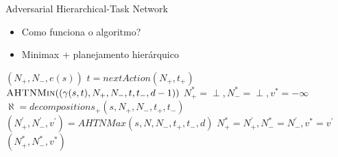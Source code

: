 \documentclass{beamer}
\begin{document}
\begin{frame}{Adversarial Hierarchical-Task Network}
	\begin{itemize}
		\item Como funciona o algoritmo?
		\item Minimax + planejamento hierárquico
	\end{itemize}
	
	{\tiny				
		\begin{algorithmic}[1]
				\label{alg:lin:firstLine}
				\State	\Return $(N_{+}, N_{-}, e(s))$
				\EndIf
				 \label{alg:ahtn:nexaction}
				\State $t = nextAction(N_{+}, t_{+})$ 
				\State \Return $\Call{AHTNMin}{(\gamma(s,t), N_{+}, N_{-}, t, t_{-}, d-1)}$ \label{alg:ahtn:troca}
				\EndIf
				\State $N_{+}^{*} = \perp, N_{-}^{*} = \perp, v^{*} = -\infty$
				\State $\aleph = decompositions_{+}(s, N_{+}, N_{-}, t_{+}, t_{-})$ \label{alg:decompositions}
				 \label{alg:ahtn:for}
				\State $(N^{'}_{+}, N^{'}_{-}, v^{'}) = AHTNMax(s, N, N_{-}, t_{+}, t_{-}, d)$
				\State $N_{+}^{*} = N^{'}_{+}, N_{-}^{*} = N^{'}_{-}, v^{*} = v^{'} $
				\EndIf
				\EndFor		
				\State \Return $(N_{+}^{*}, N_{-}^{*}, v^{*} )$
				\EndFunction
		\end{algorithmic}
	}
\end{frame}
\end{document}
